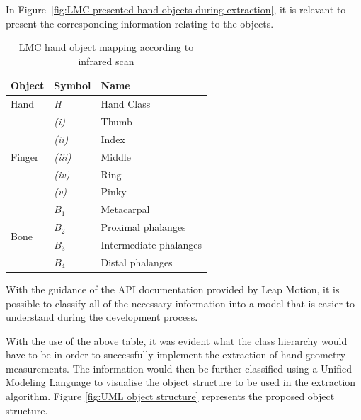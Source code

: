 In Figure~\ref{fig:LMC presented hand objects during extraction}, it is relevant to present the corresponding information relating to the objects.



    \begin{table}[h!]
    \caption{LMC hand object mapping according to infrared scan}
    \centering
     \begin{tabular}{|p{} | p{}| p{}|} 
     \hline
    	\textbf{Object} & \textbf{Symbol} & \textbf{Name} \\ [1ex] 
     \hline\hline 
     Hand & \textit{H} & Hand Class  \\
     \hline 
     \multirow{5}{*}{Finger} & \textit{(i)} & Thumb \\

            & \textit{(ii)} & Index     \\
     
            & \textit{(iii)} & Middle     \\
     
            & \textit{(iv)} & Ring     \\
     
            & \textit{(v)} & Pinky      \\
    \hline        
    \multirow{4}{*}{Bone} & \(B_1\) & Metacarpal\\
     
            & \(B_2\) & Proximal phalanges     \\
     
            & \(B_3\) & Intermediate phalanges     \\
     
            & \(B_4\) & Distal phalanges     \\
     \hline
     \end{tabular}
    \end{table}
    
With the guidance of the API documentation provided by Leap Motion, it is possible to classify all of the necessary information into a model that is easier to understand during the development process. 

With the use of the above table, it was evident what the class hierarchy would have to be in order to successfully implement the extraction of hand geometry measurements. The information would then be further classified using a Unified Modeling Language to visualise the object structure to be used in the extraction algorithm. Figure \ref{fig:UML object structure} represents the proposed object structure.

